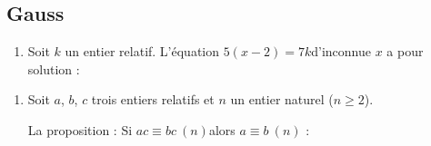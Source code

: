 \documentclass{cornouaille}
\newcommand{\ofg}[1]{\og #1 \fg}
\begin{document}
\begin{QCM}
\begin{GroupeQCM}
\subsection{Gauss}
\begin{enumerate}
\setcounter{enumi}{\value{questionqcm}}
\item 
Soit $k$ un entier relatif. L'équation $5(x-2)=7k$\enskip d'inconnue $x$ a pour solution :
\end{enumerate}
\setcounter{enumii}{0}
\begin{solution}
\end{solution}
\begin{enumerate}
\setcounter{enumi}{\value{questionqcm}}
\item 
Soit $a$, $b$, $c$ trois entiers relatifs et $n$ un entier naturel ($n\geq2$).

La proposition : \ofg{Si \enskip $ac\equiv bc~(n)$\enskip alors
  \enskip $a\equiv b~(n)$} :
\end{enumerate}
\setcounter{enumii}{0}
\begin{solution}
\end{solution}
\end{GroupeQCM}
\end{QCM}
\end{document}
